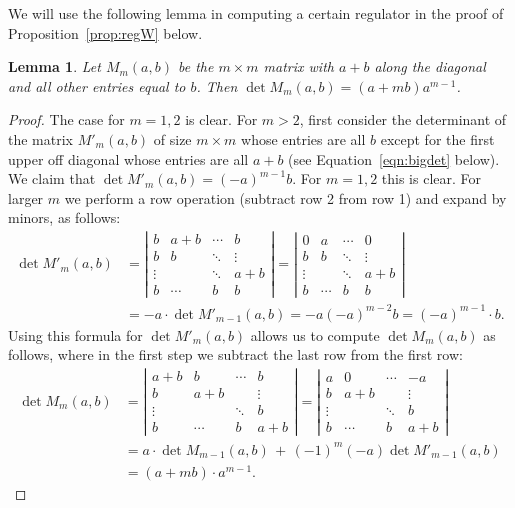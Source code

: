 \documentclass[preprint,12pt]{elsarticle}
\theoremstyle{plain}
\newtheorem{lemma}[theorem]{Lemma}
\theoremstyle{definition}
\begin{document}
We will use the following lemma in computing a certain regulator
in the proof of Proposition~\ref{prop:regW} below.
\begin{lemma}
\label{lemma:det}
Let $M_m(a,b)$ be the $m \times m$ matrix with $a+b$ along the
diagonal and all other entries equal to $b$.  Then $\det M_m(a,b) =
(a+mb)a^{m-1}$.
\end{lemma}

\begin{proof}
  The case for $m=1,2$ is clear. For $m>2$, first consider the
  determinant of the matrix $M'_m(a,b)$ of size $m \times m$ whose
  entries are all $b$ except for the first upper off diagonal whose
  entries are all $a+b$ (see Equation~\eqref{eqn:bigdet} below). We
  claim that $\det M'_m(a,b) = (-a)^{m-1}b$. For $m=1,2$ this is
  clear. For larger $m$ we perform a row operation (subtract row 2
  from row 1) and expand by minors, as follows:
\begin{align}\label{eqn:bigdet}
\det M'_m(a,b)
&=
\left| 
\begin{array}{cccc}
 b & a+b  & \cdots & b  \\
 b & b  & \ddots & \vdots  \\
 \vdots &   & \ddots & a+b \\
b & \cdots & b & b
\end{array}
\right|
=
\left| 
\begin{array}{cccc}
 0 & a  & \cdots & 0  \\
 b & b  & \ddots & \vdots  \\
 \vdots &   & \ddots & a+b \\
b & \cdots & b & b
\end{array}
\right|\\
&= -a \cdot \det M'_{m-1}(a,b) 
= -a (-a)^{m-2} b
 = (-a)^{m-1} \cdot b.
\end{align}
Using this formula for $\det M'_m(a,b)$ allows us to compute $\det M_m(a,b)$ as follows,
where in the first step we subtract the last row from the first row:
\begin{align*}
\det M_m(a,b)
&=
\left| 
\begin{array}{cccc}
 a+b & b  & \cdots & b  \\
 b & a+b  & & \vdots  \\
 \vdots &   & \ddots & b \\
 b & \cdots & b & a+b   
\end{array}
\right|
=
\left| 
\begin{array}{cccc}
 a & 0  & \cdots & -a  \\
 b & a+b  & & \vdots  \\
 \vdots &   & \ddots & b \\
 b & \cdots & b & a+b   
\end{array}
\right|\\
&= a \cdot \det M_{m-1}(a,b) \, +\, (-1)^m (-a) \det M'_{m-1}(a,b) \\
&= (a+mb) \cdot a^{m-1}.
\end{align*}

\end{proof}
\end{document}
